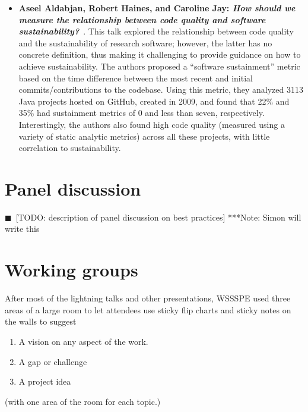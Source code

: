 \documentclass[11pt, oneside]{amsart}
\newcommand{\todo}[1]{{\color{blue}$\blacksquare$~\textsf{[TODO: #1]}}}
\newcommand{\note}[1]{ {\textcolor{blueish}    { ***Note:      #1 }}}
\begin{document}
\begin{itemize}[itemsep=1ex]
    \item \textbf{Aseel Aldabjan, Robert Haines, and
    Caroline Jay\textsuperscript{\textasteriskcentered}: \textit{How should we
    measure the relationship between code quality and software
    sustainability?}}~\cite{Aldabjan:2016ws}.
    This talk explored the relationship between code quality and the sustainability
    of research software; however, the latter has no concrete definition, thus making
    it challenging to provide guidance on how to achieve sustainability. The authors
    proposed a ``software sustainment'' metric based on the time difference between
    the most recent and initial commits\slash contributions to the codebase.
    Using this metric, they analyzed 3113 Java projects hosted on GitHub, created
    in 2009, and found that 22\% and 35\% had sustainment metrics of 0 and less
    than seven, respectively. Interestingly, the authors also found high
    code quality (measured using a variety of static analytic metrics) across
    all these projects, with little correlation to sustainability.


\end{itemize}

\section{Panel discussion} \label{sec:panel}

\todo{description of panel discussion on best practices} \note{Simon will write this}

\section{Working groups} \label{sec:WGs}

After most of the lightning talks and other presentations, WSSSPE used three areas of a large room to let
attendees use sticky flip charts and sticky notes on the walls to suggest
\begin{enumerate}
\item A vision on any aspect of the work.
\item A gap or challenge
\item A project idea
\end{enumerate}
(with one area of the room for each topic.)
\end{document}
